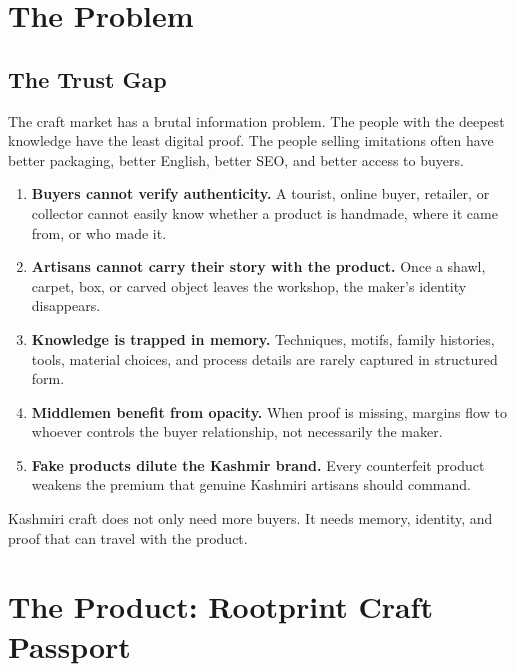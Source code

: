 \documentclass[11pt,a4paper]{article}
\begin{document}
\section{The Problem}

\subsection{The Trust Gap}

The craft market has a brutal information problem. The people with the deepest knowledge have the least digital proof. The people selling imitations often have better packaging, better English, better SEO, and better access to buyers.

\begin{enumerate}
  \item \textbf{Buyers cannot verify authenticity.} A tourist, online buyer, retailer, or collector cannot easily know whether a product is handmade, where it came from, or who made it.
  \item \textbf{Artisans cannot carry their story with the product.} Once a shawl, carpet, box, or carved object leaves the workshop, the maker's identity disappears.
  \item \textbf{Knowledge is trapped in memory.} Techniques, motifs, family histories, tools, material choices, and process details are rarely captured in structured form.
  \item \textbf{Middlemen benefit from opacity.} When proof is missing, margins flow to whoever controls the buyer relationship, not necessarily the maker.
  \item \textbf{Fake products dilute the Kashmir brand.} Every counterfeit product weakens the premium that genuine Kashmiri artisans should command.
\end{enumerate}

\begin{redbox}
Kashmiri craft does not only need more buyers. It needs memory, identity, and proof that can travel with the product.
\end{redbox}

\section{The Product: Rootprint Craft Passport}
\end{document}
